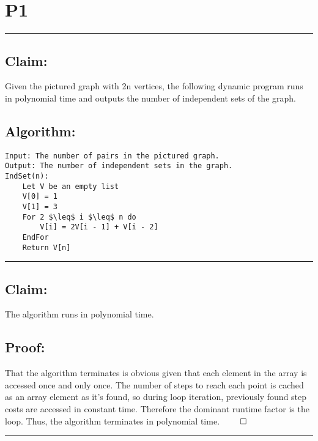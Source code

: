 \documentclass[11pt]{article}
\title{}
\author{}
\date{}
\begin{document}
\section*{P1}

\noindent\textcolor[RGB]{220,220,220}{\rule{\linewidth}{0.8pt}}

\subsection*{Claim:} 

Given the pictured graph with 2n vertices, the following dynamic program runs in polynomial time and outputs the number of independent sets of the graph. 

\subsection*{Algorithm:}

\begin{lstlisting}[basicstyle=\small, mathescape=true]
Input: The number of pairs in the pictured graph.
Output: The number of independent sets in the graph. 
IndSet(n):
	Let V be an empty list
	V[0] = 1
	V[1] = 3
	For 2 $\leq$ i $\leq$ n do
		V[i] = 2V[i - 1] + V[i - 2]
	EndFor
	Return V[n]
\end{lstlisting}

\noindent\textcolor[RGB]{220,220,220}{\rule{\linewidth}{0.8pt}}
\linebreak

\subsection*{Claim:} 

The algorithm runs in polynomial time.

\subsection*{Proof:}

That the algorithm terminates is obvious given that each element in the array is accessed once and only once. The number of steps to reach each point is cached as an array element as it's found, so during loop iteration, previously found step costs are accessed in constant time. Therefore the dominant runtime factor is the loop. Thus, the algorithm terminates in polynomial time. $\qed$

\noindent\textcolor[RGB]{220,220,220}{\rule{\linewidth}{0.8pt}}
\end{document}
